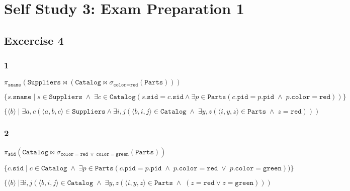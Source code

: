 \section{Self Study 3: Exam Preparation 1}

\subsection{Excercise 4}

\subsubsection*{1}
 $\pi_{\texttt{sname}}(\texttt{Suppliers} \bowtie (\texttt{Catalog} \bowtie \sigma_{\texttt{color} = \texttt{red}}(\texttt{Parts})))$
 
\hspace{20px}
 
 $\{s.\texttt{sname} \; | \; s \in \texttt{Suppliers} \; \wedge \; \exists c \in \texttt{Catalog}(s.\mathtt{sid} = c.\mathtt{sid} \wedge \exists p \in \texttt{Parts}(c.\mathtt{pid} = p.\mathtt{pid} \; \wedge \; p.\mathtt{color} = \mathtt{red}))\}$

\hspace{20px}
 
 $\{\langle b \rangle  \; | \; \exists a, c (\langle a, b, c \rangle   \in \mathtt{Suppliers} \wedge 
 \exists i,j(\langle b,i,j \rangle  \in \mathtt{Catalog} \; \wedge \;
 \exists y, z(\langle i, y, z \rangle  \in \mathtt{Parts} \; \wedge \; z = \mathtt{red})
 ))$
 
 \subsubsection*{2}
$\pi_{\mathtt{sid}}(\mathtt{Catalog} \bowtie 
\sigma_{\mathtt{color} = \mathtt{red} \; \vee \; \mathtt{color} = \mathtt{green} }(\mathtt{Parts}))$
 
\hspace{20px}

 $\{c.\mathtt{sid} \; | \; c \in \mathtt{Catalog} \; \wedge \; \exists p \in \mathtt{Parts}
 (c.\mathtt{pid} = p.\mathtt{pid} \; \wedge \; p.\mathtt{color} = \mathtt{red} \; \vee \; p.\mathtt{color} = \mathtt{green}))\}$
 
\hspace{20px}
 
 $\{\langle b \rangle  \; | \exists i,j
 (\langle b,i,j \rangle  \in \mathtt{Catalog} \; \wedge \; \exists y, z
 (\langle i, y, z \rangle  \in \mathtt{Parts} \; \wedge \; (z = \mathtt{red} \vee z = \mathtt{green}))
 )$

